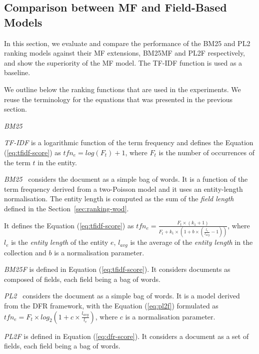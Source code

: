 \subsection{Comparison between MF and Field-Based Models}
\label{sec:mf-field-cmp}

In this section, we evaluate and compare the performance of the BM25 and PL2 ranking models against their \gls{MF} extensions, \gls{BM25MF} and PL2F respectively, and show the superiority of the \gls{MF} model. The TF-IDF function is used as a baseline.

We outline below the ranking functions that are used in the experiments. We reuse the terminology for the equations that was presented in the previous section.

\begin{labeling}{\emph{BM25~\cite{robertson:1994:sigir}}}
  \item[\emph{TF-IDF}] is a logarithmic function of the term frequency and defines the Equation (\ref{eq:tfidf-score}) as
  $
  tfn_e=log(F_t)+1
  $,
  where $F_t$ is the number of occurrences of the term $t$ in the entity.
  \item[\emph{BM25~\cite{robertson:1994:sigir}}] considers the document as a simple bag of words. It is a function of the term frequency derived from a two-Poisson model and it uses an entity-length normalisation. The entity length is computed as the sum of the \emph{field length} defined in the Section~\ref{sec:ranking-wod}.

  It defines the Equation (\ref{eq:tfidf-score}) as
  $
  tfn_e=\frac{F_t\times(k_1+1)}{F_t+k_1\times \left(1+b\times\left(\frac{l_e}{l_{avg}}-1\right)\right)}
  $,
where $l_e$ is the \emph{entity length} of the entity $e$, $l_{avg}$ is the average of the \emph{entity length} in the collection and $b$ is a normalisation parameter.
  \item[\emph{BM25F}] is defined in Equation (\ref{eq:tfidf-score}). It considers documents as composed of fields, each field being a bag of words.
  \item[\emph{PL2~\cite{amati:2002:acm}}] considers the document as a simple bag of words. It is a model derived from the DFR framework, with the Equation (\ref{eq:pl2f}) formulated as
  $
  tfn_e=F_t\times log_2\left(1+c\times\frac{l_{avg}}{l_e}\right)
  $,
  where $c$ is a normalisation parameter.
  \item[\emph{PL2F}] is defined in Equation (\ref{eq:dfr-score}). It considers a document as a set of fields, each field being a bag of words.
\end{labeling}

